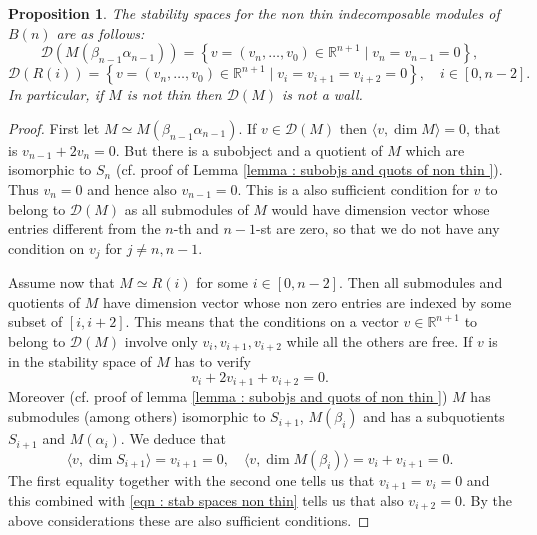 \documentclass[11pt]{amsart}
\newtheorem{proposition}[theorem]{Proposition}
\theoremstyle{definition}
\begin{document}
\begin{proposition}\label{prop : walls for non thin}The stability spaces for the non thin indecomposable modules of $B(n)$ are as follows:
\[
\mathcal{D}(M(\beta_{n-1}\alpha_{n-1}))=\left\{v=(v_n, \ldots, v_0)\in\mathbb{R}^{n+1}\mid v_n=v_{n-1}=0\right\},
\]
    \[
    \mathcal{D}(R(i))=\left\{v=(v_n, \ldots, v_0)\in\mathbb{R}^{n+1}\mid v_i=v_{i+1}=v_{i+2}=0\right\}, \quad i\in[0,n-2].
    \]
    In particular, if $M$ is not thin then $\mathcal{D}(M)$ is not a wall. 
\end{proposition}
\begin{proof}First let $M\simeq M(\beta_{n-1}\alpha_{n-1})$. If  $v\in\mathcal{D}(M)$ then $\langle v,\dim M\rangle=0$, that is $v_{n-1}+2v_{n}=0$. But there is a subobject and a quotient of $M$ which are isomorphic to $S_n$ (cf. proof of Lemma \ref{lemma : subobjs and quots of non thin }). Thus $v_n=0$ and hence also $v_{n-1}=0$. This is a also sufficient condition for $v$ to belong to $\mathcal{D}(M)$ as all submodules of $M$ would have dimension vector whose entries different from the $n$-th and $n-1$-st are zero, so that we do not have any condition on $v_j$ for $j\neq n, n-1$.

Assume now that $M\simeq R(i)$ for some $i\in[0,n-2]$. Then all submodules and quotients of $M$ have dimension vector whose non zero entries are indexed by some subset of $[i,i+2]$. This means that the conditions on a vector $v\in\mathbb{R}^{n+1}$ to belong to $\mathcal{D}(M)$ involve only $v_{i}, v_{i+1}, v_{i+2}$ while all the others are free. If $v$ is in the stability space of $M$ has to verify 
\begin{equation}\label{eqn : stab spaces non thin}
    v_i+2v_{i+1}+v_{i+2}=0.
\end{equation} Moreover  (cf. proof of lemma \ref{lemma : subobjs and quots of non thin }) $M$ has submodules (among others) isomorphic to $S_{i+1}$, $M(\beta_i)$ and has a subquotients $S_{i+1}$ and $M(\alpha_i)$. We deduce that
\[
\langle v, \dim S_{i+1}\rangle=v_{i+1}=0, \quad \langle v, \dim M(\beta_i)\rangle=v_i+v_{i+1}=0.
\]
The first equality together with the second one tells us that $v_{i+1}=v_i=0$ and this combined with \eqref{eqn : stab spaces non thin} tells us that also $v_{i+2}=0$. By the above considerations these are also sufficient conditions.
\end{proof}
\end{document}
